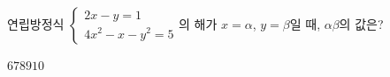연립방정식 $\begin{cases} 2x-y=1 \\ 4x^2-x-y^2=5 \end{cases}$의 해가 $x=\alpha$, $y=\beta$일 때, $\alpha\beta$의 값은?
\begin{choices32}{$6$}{$7$}{$8$}{$9$}{$10$}\end{choices32}
